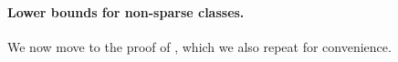 \paragraph*{Lower bounds for non-sparse classes.}
We now move to the proof of , which we also repeat for
convenience.

